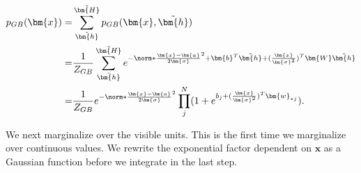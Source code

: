 \begin{align}
	p_{GB} (\bm{x}) =& \sum_{\tilde{\bm{h}}}^{\tilde{\bm{H}}} p_{GB} (\bm{x}, \tilde{\bm{h}}) \nonumber \\
	=& \frac{1}{Z_{GB}} \sum_{\tilde{\bm{h}}}^{\tilde{\bm{H}}} 
	e^{-\norm*{\frac{\bm{x} -\bm{a}}{2\bm{\sigma}}}^2 + \bm{b}^T \tilde{\bm{h}} 
	+ (\frac{\bm{x}}{\bm{\sigma}^2})^T \bm{W}\tilde{\bm{h}}} \nonumber \\
	=& \frac{1}{Z_{GB}} e^{-\norm*{\frac{\bm{x} -\bm{a}}{2\bm{\sigma}}}^2}
	\prod_j^N (1 + e^{b_j + (\frac{\bm{x}}{\bm{\sigma}^2})^T \bm{w}_{\ast j}} ) .
\end{align}

We next marginalize over the visible units. This is the first time we marginalize over continuous values. We rewrite the exponential factor dependent on $\bm{x}$ as a Gaussian function before we integrate in the last step.

